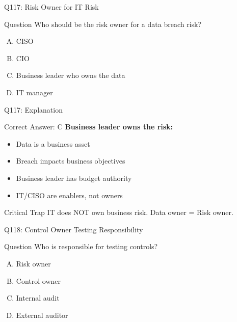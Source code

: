 \documentclass{beamer}
\begin{document}
	\begin{frame}{Q117: Risk Owner for IT Risk}
		\begin{block}{Question}
			Who should be the risk owner for a data breach risk?
		\end{block}
		\begin{enumerate}[(A)]
			\item CISO
			\item CIO
			\item Business leader who owns the data
			\item IT manager
		\end{enumerate}
	\end{frame}
	
	\begin{frame}{Q117: Explanation}
		\begin{block}{Correct Answer: C}
			\textbf{Business leader owns the risk:}
			\begin{itemize}
				\item Data is a business asset
				\item Breach impacts business objectives
				\item Business leader has budget authority
				\item IT/CISO are enablers, not owners
			\end{itemize}
		\end{block}
		\begin{alertblock}{Critical Trap}
			IT does NOT own business risk.
			Data owner = Risk owner.
		\end{alertblock}
	\end{frame}
	
	\begin{frame}{Q118: Control Owner Testing Responsibility}
		\begin{block}{Question}
			Who is responsible for testing controls?
		\end{block}
		\begin{enumerate}[(A)]
			\item Risk owner
			\item Control owner
			\item Internal audit
			\item External auditor
		\end{enumerate}
	\end{frame}
	
\end{document}
